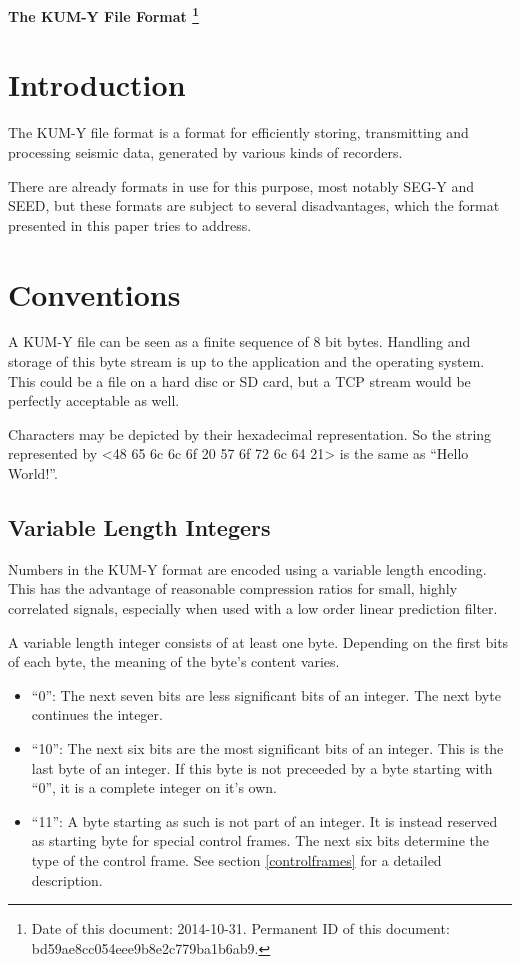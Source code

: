 \documentclass[DIV=10]{scrartcl}
\begin{document}
\strut

\vspace{1cm}

\centerline{\huge \textbf{The KUM-Y File Format%
\footnote{\raggedright Date of this document: 2014-10-31.
Permanent ID of this document: bd59ae8cc054eee9b8e2c779ba1b6ab9.}}}

\vspace{1cm}

\section{Introduction}

The KUM-Y file format is a format for efficiently storing, transmitting and processing seismic data, generated by various kinds of recorders.

There are already formats in use for this purpose, most notably SEG-Y and SEED, but these formats are subject to several disadvantages, which the format presented in this paper tries to address.

\section{Conventions}

A KUM-Y file can be seen as a finite sequence of 8 bit bytes.
Handling and storage of this byte stream is up to the application and the operating system.
This could be a file on a hard disc or SD card, but a TCP stream would be perfectly acceptable as well.

Characters may be depicted by their hexadecimal representation.
So the string represented by <48 65 6c 6c 6f 20 57 6f 72 6c 64 21> is the same as “Hello World!”.

\subsection{Variable Length Integers}
\label{varint}

Numbers in the KUM-Y format are encoded using a variable length encoding.
This has the advantage of reasonable compression ratios for small, highly correlated signals, especially when used with a low order linear prediction filter.

A variable length integer consists of at least one byte.
Depending on the first bits of each byte, the meaning of the byte’s content varies.

\begin{itemize}
\item “0”: The next seven bits are less significant bits of an integer.
The next byte continues the integer.
\item “10”: The next six bits are the most significant bits of an integer.
This is the last byte of an integer.
If this byte is not preceeded by a byte starting with “0”, it is a complete integer on it’s own.
\item “11”: A byte starting as such is not part of an integer.
It is instead reserved as starting byte for special control frames.
The next six bits determine the type of the control frame.
See section \ref{controlframes} for a detailed description.
\end{itemize}
\end{document}
